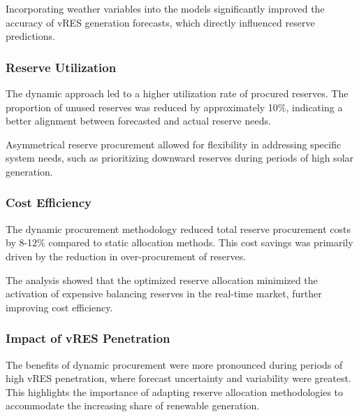 Incorporating weather variables into the models significantly improved the accuracy of vRES generation forecasts, which directly influenced reserve predictions.

\subsubsection*{Reserve Utilization}
The dynamic approach led to a higher utilization rate of procured reserves. The proportion of unused reserves was reduced by approximately 10\%, indicating a better alignment between forecasted and actual reserve needs.

Asymmetrical reserve procurement allowed for flexibility in addressing specific system needs, such as prioritizing downward reserves during periods of high solar generation.

\subsubsection*{Cost Efficiency}
The dynamic procurement methodology reduced total reserve procurement costs by 8-12\% compared to static allocation methods. This cost savings was primarily driven by the reduction in over-procurement of reserves.

The analysis showed that the optimized reserve allocation minimized the activation of expensive balancing reserves in the real-time market, further improving cost efficiency.

\subsubsection*{Impact of vRES Penetration}
The benefits of dynamic procurement were more pronounced during periods of high vRES penetration, where forecast uncertainty and variability were greatest. This highlights the importance of adapting reserve allocation methodologies to accommodate the increasing share of renewable generation.
